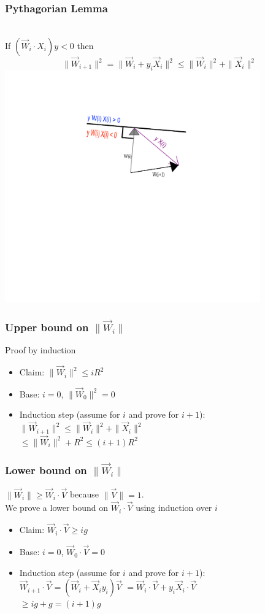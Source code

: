 \documentclass[handout]{beamer}
\newcommand{\W}{\vec{W}}
\newcommand{\V}{\vec{V}}
\newcommand{\X}{\vec{X}}
\begin{document}
\begin{frame}
\frametitle{Pythagorian Lemma}
~\\
If $(\W_i \cdot X_i) y <0$ then\\
\pause
\[
\| \W_{i+1} \|^2 = \|\W_i + y_i \X_i\|^2 \leq \|\W_i\|^2 + \|\X_i\|^2 
\]
\pause
\includegraphics[height=10cm]{PerceptronAnim/PerceptronError.pdf}
\end{frame}

\begin{frame}
\frametitle{Upper bound on $\| \W_i \|$}
\pause
Proof by induction
\begin{itemize}
\item Claim: $ \| \W_{i} \|^2 \leq i R^2 $
\item Base: $i=0$, $\|\W_0\|^2 = 0$
\item Induction step (assume for $i$ and prove for $i+1$):\\
$ \| \W_{i+1} \|^2 \leq \|\W_i\|^2 + \|\X_i\|^2 $ \\
$\leq \|\W_i\|^2 + R^2 \leq (i+1) R^2$

\end{itemize}
\end{frame}

\begin{frame}
\frametitle{Lower bound on $\| \W_i \|$}
\pause
$\|\W_i\| \geq \W_{i} \cdot \V$ because $\| \V \|=1$.\\
\pause
We prove a lower bound on $\W_{i} \cdot \V$ using induction over $i$
\begin{itemize}
\item Claim: $ \W_{i} \cdot \V \geq i g $
\item Base: $i=0$, $\W_0 \cdot \V = 0$
\item Induction step (assume for $i$ and prove for $i+1$):\\
$ \W_{i+1} \cdot \V  = \left( \W_i + \X_i y_i \right) \V$
\pause
$= \W_i \cdot \V + y_i \X_i \cdot \V$ \\
$\geq i g + g = (i+1) g$
\end{itemize}
\end{frame}
\end{document}
